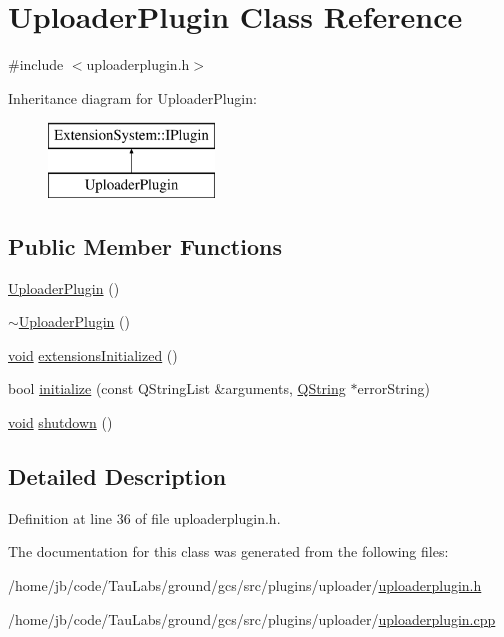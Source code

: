 \hypertarget{class_uploader_plugin}{\section{\-Uploader\-Plugin \-Class \-Reference}
\label{class_uploader_plugin}
}


{\ttfamily \#include $<$uploaderplugin.\-h$>$}

\-Inheritance diagram for \-Uploader\-Plugin\-:\begin{figure}[H]
\begin{center}
\leavevmode
\includegraphics[height=2.000000cm]{class_uploader_plugin}
\end{center}
\end{figure}
\subsection*{\-Public \-Member \-Functions}
\begin{DoxyCompactItemize}
\item 
\hyperlink{group___y_modem_uploader_ga5dbbc19d5b4c070d0326c2e8695b2a9b}{\-Uploader\-Plugin} ()
\item 
\hyperlink{group___y_modem_uploader_gab9ab9e0558901e7f3ca2e24750ded4e2}{$\sim$\-Uploader\-Plugin} ()
\item 
\hyperlink{group___u_a_v_objects_plugin_ga444cf2ff3f0ecbe028adce838d373f5c}{void} \hyperlink{group___y_modem_uploader_ga1e319fd52ea2d055faae5cfcc9b38041}{extensions\-Initialized} ()
\item 
bool \hyperlink{group___y_modem_uploader_gaed3cc44adfc0c7107aa35f52e5265da2}{initialize} (const \-Q\-String\-List \&arguments, \hyperlink{group___u_a_v_objects_plugin_gab9d252f49c333c94a72f97ce3105a32d}{\-Q\-String} $\ast$error\-String)
\item 
\hyperlink{group___u_a_v_objects_plugin_ga444cf2ff3f0ecbe028adce838d373f5c}{void} \hyperlink{group___y_modem_uploader_gac966b3a48b2c1de74e802f0092479ab2}{shutdown} ()
\end{DoxyCompactItemize}


\subsection{\-Detailed \-Description}


\-Definition at line 36 of file uploaderplugin.\-h.



\-The documentation for this class was generated from the following files\-:\begin{DoxyCompactItemize}
\item 
/home/jb/code/\-Tau\-Labs/ground/gcs/src/plugins/uploader/\hyperlink{uploaderplugin_8h}{uploaderplugin.\-h}\item 
/home/jb/code/\-Tau\-Labs/ground/gcs/src/plugins/uploader/\hyperlink{uploaderplugin_8cpp}{uploaderplugin.\-cpp}\end{DoxyCompactItemize}
